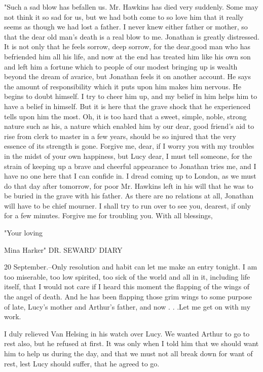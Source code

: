 "Such a sad blow has befallen us. Mr. Hawkins has died very suddenly. Some may not think it so sad for us, but we had both come to so love him that it really seems as though we had lost a father. I never knew either father or mother, so that the dear old man's death is a real blow to me. Jonathan is greatly distressed. It is not only that he feels sorrow, deep sorrow, for the dear,good man who has befriended him all his life, and now at the end has treated him like his own son and left him a fortune which to people of our modest bringing up is wealth beyond the dream of avarice, but Jonathan feels it on another account. He says the amount of responsibility which it puts upon him makes him nervous. He begins to doubt himself. I try to cheer him up, and my belief in him helps him to have a belief in himself. But it is here that the grave shock that he experienced tells upon him the most. Oh, it is too hard that a sweet, simple, noble, strong nature such as his, a nature which enabled him by our dear, good friend's aid to rise from clerk to master in a few years, should be so injured that the very essence of its strength is gone. Forgive me, dear, if I worry you with my troubles in the midst of your own happiness, but Lucy dear, I must tell someone, for the strain of keeping up a brave and cheerful appearance to Jonathan tries me, and I have no one here that I can confide in. I dread coming up to London, as we must do that day after tomorrow, for poor Mr. Hawkins left in his will that he was to be buried in the grave with his father. As there are no relations at all, Jonathan will have to be chief mourner. I shall try to run over to see you, dearest, if only for a few minutes. Forgive me for troubling you. With all blessings, 

"Your loving 

Mina Harker" DR. SEWARD' DIARY 

20 September.--Only resolution and habit can let me make an entry tonight. I am too miserable, too low spirited, too sick of the world and all in it, including life itself, that I would not care if I heard this moment the flapping of the wings of the angel of death. And he has been flapping those grim wings to some purpose of late, Lucy's mother and Arthur's father, and now . . .Let me get on with my work. 

I duly relieved Van Helsing in his watch over Lucy. We wanted Arthur to go to rest also, but he refused at first. It was only when I told him that we should want him to help us during the day, and that we must not all break down for want of rest, lest Lucy should suffer, that he agreed to go. 

